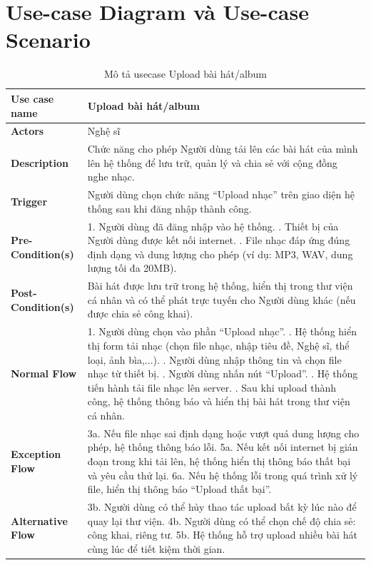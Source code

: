 \documentclass[a4paper]{article}
\begin{document}
\section{Use-case Diagram và Use-case Scenario}
\begin{table}[h!]
\centering
\renewcommand{\arraystretch}{1.3} %
\begin{tabularx}{\textwidth}{|l|X|}
\hline
\textbf{Use case name} & Upload bài hát/album \\ \hline
\textbf{Actors}        & Nghệ sĩ \\ \hline
\textbf{Description}   & Chức năng cho phép Người dùng tải lên các bài hát của mình lên hệ thống để lưu trữ, quản lý và chia sẻ với cộng đồng nghe nhạc. \\ \hline
\textbf{Trigger}       & Người dùng chọn chức năng “Upload nhạc” trên giao diện hệ thống sau khi đăng nhập thành công. \\ \hline
\textbf{Pre-Condition(s)} 
& 1. Người dùng đã đăng nhập vào hệ thống. \newline
  2. Thiết bị của Người dùng được kết nối internet. \newline
  3. File nhạc đáp ứng đúng định dạng và dung lượng cho phép (ví dụ: MP3, WAV, dung lượng tối đa 20MB). \\ \hline
\textbf{Post-Condition(s)} 
& Bài hát được lưu trữ trong hệ thống, hiển thị trong thư viện cá nhân và có thể phát trực tuyến cho Người dùng khác (nếu được chia sẻ công khai). \\ \hline
\textbf{Normal Flow}   
& 1. Người dùng chọn vào phần “Upload nhạc”. \newline
  2. Hệ thống hiển thị form tải nhạc (chọn file nhạc, nhập tiêu đề, Nghệ sĩ, thể loại, ảnh bìa,...). \newline
  3. Người dùng nhập thông tin và chọn file nhạc từ thiết bị. \newline
  4. Người dùng nhấn nút “Upload”. \newline
  5. Hệ thống tiến hành tải file nhạc lên server. \newline
  6. Sau khi upload thành công, hệ thống thông báo và hiển thị bài hát trong thư viện cá nhân. \\ \hline
\textbf{Exception Flow} 
& 3a. Nếu file nhạc sai định dạng hoặc vượt quá dung lượng cho phép, hệ thống thông báo lỗi. \newline
  5a. Nếu kết nối internet bị gián đoạn trong khi tải lên, hệ thống hiển thị thông báo thất bại và yêu cầu thử lại. \newline
  6a. Nếu hệ thống lỗi trong quá trình xử lý file, hiển thị thông báo “Upload thất bại”. \\ \hline
\textbf{Alternative Flow} 
& 3b. Người dùng có thể hủy thao tác upload bất kỳ lúc nào để quay lại thư viện. \newline
  4b. Người dùng có thể chọn chế độ chia sẻ: công khai, riêng tư. \newline
  5b. Hệ thống hỗ trợ upload nhiều bài hát cùng lúc để tiết kiệm thời gian. \\ \hline
\end{tabularx}
\caption{Mô tả usecase Upload bài hát/album}
\end{table}
\end{document}
